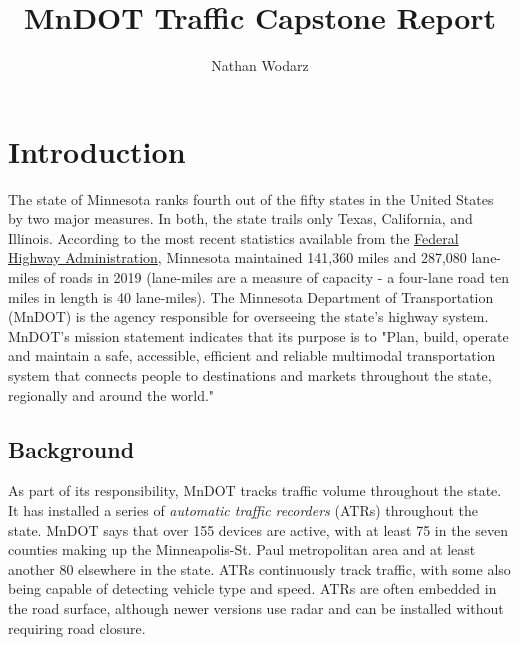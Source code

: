 \documentclass[9pt,twocolumn,twoside, lineno]{jost-new}
\title{MnDOT Traffic Capstone Report}
\author{Nathan Wodarz}
\numberwithin{subsection}{section}
\begin{document}
\maketitle
\thispagestyle{firststyle}
\begin{nolinenumbers}
\tableofcontents
\end{nolinenumbers}
\pagebreak


\section{Introduction}\label{sec:introduction}
The state of Minnesota ranks fourth out of the fifty states in the United States by two major measures.
In both, the state trails only Texas, California, and Illinois.
According to the most recent statistics available from the \href{https://www.fhwa.dot.gov/policyinformation/statistics/2019/}{Federal Highway Administration}\cite{fhwa}, Minnesota maintained 141,360 miles and 287,080 lane-miles of roads in 2019 (lane-miles are a measure of capacity - a four-lane road ten miles in length is 40 lane-miles).
The Minnesota Department of Transportation (MnDOT) is the agency responsible for overseeing the state's highway system.
MnDOT's mission statement indicates that its purpose is to "Plan, build, operate and maintain a safe, accessible, efficient and reliable multimodal transportation system that connects people
to destinations and markets throughout the state, regionally and around the world."\cite{mndot}

\subsection{Background}\label{subsec:background2}
As part of its responsibility, MnDOT tracks traffic volume throughout the state.
It has installed a series of \emph{automatic traffic recorders} (ATRs) throughout the state.
MnDOT says that over 155 devices are active, with at least 75  in the seven counties making up the Minneapolis-St. Paul metropolitan area and at least another 80 elsewhere in the state.
ATRs continuously track traffic, with some also being capable of detecting vehicle type and speed.
ATRs are often embedded in the road surface, although newer versions use radar and can be installed without requiring road closure.
\end{document}
